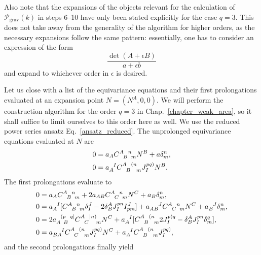 Also note that the expansions of the objects relevant for the calculation of $\mathcal P_\text{grav}(k)$ in steps 6--10 have only been stated explicitly for the case $q=3$. This does not take away from the generality of the algorithm for higher orders, as the necessary expansions follow the same pattern: essentially, one has to consider an expression of the form
\begin{equation}
  \frac{\operatorname{det}(A + \epsilon B)}{a + \epsilon b}
\end{equation}
and expand to whichever order in $\epsilon$ is desired.

Let us close with a list of the equivariance equations and their first prolongations evaluated at an expansion point $N = (N^A,0,0)$. We will perform the construction algorithm for the order $q=3$ in Chap.~\ref{chapter_weak_area}, so it shall suffice to limit ourselves to this order here as well. We use the reduced power series ansatz Eq.~\ref{ansatz_reduced}. The unprolonged equivariance equations evaluated at $N$ are
\begin{equation}\label{prolong_0}
  \begin{aligned}
    0 &{} = a_A \gmc{A}{B}{n}{m} N^B + a \delta^n_m, \\
    0 &{} = a_A^{\hphantom AI}\gmc{A}{B}{(n}{m} J^{pq)}_I N^B.
  \end{aligned}
\end{equation}
The first prolongations evaluate to
\begin{equation}\label{prolong_1}
  \begin{aligned}
    0 &{} = a_A \gmc{A}{B}{n}{m} + 2 a_{AB} \gmc{A}{C}{n}{m} N^C + a_B \delta^n_m, \\
    0 &{} = a_A^{\hphantom AI}\lbrack \gmc{A}{B}{n}{m} \delta^J_I - 2\delta^A_B J^{pn}_I I^J_{pm}\rbrack + a_{AB}^{\hphantom{AB}J}\gmc{A}{C}{n}{m} N^C + a_B^{\hphantom BJ} \delta^n_m, \\
    0 &{} = 2a_{A \hphantom pB}^{\hphantom A(p\hphantom Bq\mid} \gmc{A}{C}{\mid n)}{m} N^C + a_A^{\hphantom AI}\lbrack \gmc{A}{B}{(n}{m} 2J^{p)q}_I - \delta^A_B J^{pn}_I \delta^q_m\rbrack, \\
    0 &{} = a_{BA}^{\hphantom{BA}I} \gmc{A}{C}{(n}{m} J^{pq)}_I N^C + a_A^{\hphantom AI}\gmc{A}{B}{(n}{m} J^{pq)}_I,
  \end{aligned}
\end{equation}
and the second prolongations finally yield
